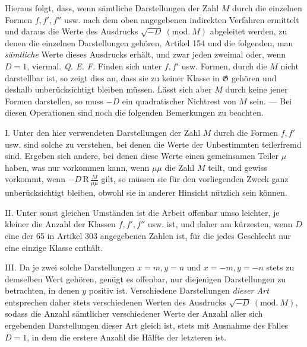 Hieraus folgt, dass, wenn sämtliche Darstellungen der Zahl \(M\) durch die einzelnen Formen \(f,\allowbreak f',\allowbreak f''\) usw. nach dem oben angegebenen indirekten Verfahren ermittelt und
daraus die Werte des Ausdrucks \(\surd{-D}\ (\mathrm{mod.}\ M)\) abgeleitet werden, zu denen die einzelnen Darstellungen gehören, Artikel 154 und die folgenden, man \textit{sämtliche} Werte dieses Ausdrucks erhält, und zwar jeden zweimal oder, wenn \(D=1\), viermal. \textit{Q. E. F.} Finden sich unter \(f,\allowbreak f'\) usw. Formen, durch die \(M\) nicht darstellbar ist, so zeigt dies an, dass sie zu keiner Klasse in \(\mathfrak G\) gehören und deshalb unberücksichtigt bleiben müssen. Lässt sich aber \(M\) durch keine jener Formen darstellen, so muss \(-D\) ein quadratischer Nichtrest von \(M\) sein. --- Bei diesen Operationen sind noch die folgenden Bemerkungen zu beachten.

I. Unter den hier verwendeten Darstellungen der Zahl \(M\) durch die Formen \(f,\allowbreak f'\) usw. sind solche zu verstehen, bei denen die Werte der Unbestimmten teilerfremd sind. Ergeben sich andere, bei denen diese Werte einen gemeinsamen Teiler \(\mu\) haben, was nur vorkommen kann, wenn \(\mu\mu\) die Zahl \(M\) teilt, und gewiss vorkommt, wenn \(-D\,\mathrm R\,\frac{M}{\mu\mu}\) gilt, so müssen sie für den vorliegenden Zweck ganz unberücksichtigt bleiben, obwohl sie in anderer Hinsicht nützlich sein können.

II. Unter sonst gleichen Umständen ist die Arbeit offenbar umso leichter, je kleiner die Anzahl der Klassen \(f,\allowbreak f',\allowbreak f''\) usw. ist, und daher am kürzesten, wenn \(D\) eine der 65 in Artikel 303 angegebenen Zahlen ist, für die jedes Geschlecht nur eine einzige Klasse enthält.

III. Da je zwei solche Darstellungen \(x=m,\allowbreak y=n\) und \(x=-m,\allowbreak y=-n\) stets zu demselben Wert gehören, genügt es offenbar, nur diejenigen Darstellungen zu betrachten, in denen \(y\) positiv ist. Verschiedene Darstellungen \textit{dieser Art} entsprechen daher stets verschiedenen Werten des Ausdrucks \(\surd{-D}\ (\mathrm{mod.}\ M)\), sodass die Anzahl sämtlicher verschiedener Werte der Anzahl aller sich ergebenden Darstellungen dieser Art gleich ist, stets mit Ausnahme des Falles \(D=1\), in dem die erstere Anzahl die Hälfte der letzteren ist.

